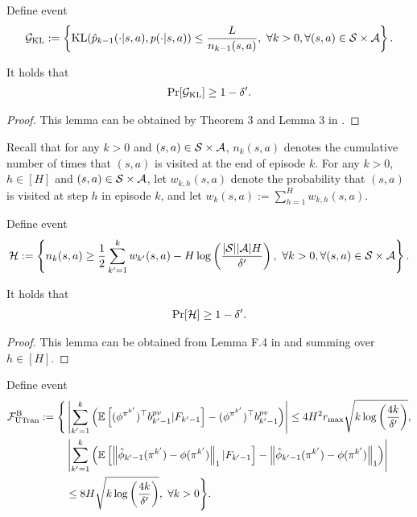 Define event
\begin{align}
	\mathcal{G}_{\textup{KL}} := \left\{  \textup{KL}(\hat{p}_{k-1}(\cdot|s,a),p(\cdot|s,a)) \leq \frac{L}{n_{k-1}(s,a)} ,\  \forall k>0, \forall (s,a) \in \mathcal{S} \times \mathcal{A}  \right\} . \label{eq:def_event_tran_kl}
\end{align}

\begin{lemma} \label{lemma:con_transition}
	It holds that
	\begin{align*}
		\Pr[\mathcal{G}_{\textup{KL}}] \geq 1-\delta' .
	\end{align*}	
\end{lemma}
\begin{proof}
	This lemma can be obtained by Theorem 3 and Lemma 3 in \cite{menard2021fast}.
\end{proof}

Recall that for any $k>0$ and $(s,a) \in \mathcal{S} \times \mathcal{A}$,  $n_k(s,a)$ denotes the cumulative number of times that $(s,a)$ is visited at the end of episode $k$. For any $k>0$, $h \in [H]$ and $(s,a) \in \mathcal{S} \times \mathcal{A}$, let $w_{k,h}(s,a)$ denote the probability that $(s,a)$ is visited at step $h$ in episode $k$, and let $w_{k}(s,a):=\sum_{h=1}^{H}w_{k,h}(s,a)$.

Define event
\begin{align}
	\mathcal{H} := \left\{  n_k(s,a) \geq \frac{1}{2} \sum_{k'=1}^{k} w_{k'}(s,a) - H \log\left( \frac{|\mathcal{S}||\mathcal{A}|H}{\delta'} \right) ,\  \forall k>0, \forall (s,a) \in \mathcal{S} \times \mathcal{A}  \right\} . \label{eq:def_event_visitation_bernoulli}
\end{align}
\begin{lemma} \label{lemma:con_visitation}
	It holds that
	\begin{align*}
		\Pr[\mathcal{H}] \geq 1-\delta' .
	\end{align*}	
\end{lemma}
\begin{proof}
	This lemma can be obtained from Lemma F.4 in \cite{dann2017unifying} and summing over $h \in [H]$.
\end{proof}


Define event 
\begin{align*}
	\mathcal{F}^{\textup{B}}_{\textup{UTran}}:=\Bigg\{ 
	&\left| \sum_{k'=1}^{k} \left(  \mathbb{E}\left[  (\phi^{\pi^{k'}})^\top b^{pv}_{k'-1} | F_{k'-1}  \right] - (\phi^{\pi^{k'}})^\top b^{pv}_{k'-1}  \right) \right| \leq 4 H^2 r_{\max} \sqrt{ k \log\left( \frac{4k}{\delta'} \right) } ,
	\nonumber\\
	&\left| \sum_{k'=1}^{k} \left( \mathbb{E}\left[  \left\|  \hat{\phi}_{k'-1}(\pi^{k'}) - \phi(\pi^{k'})  \right\|_1 | F_{k'-1}  \right] - \left\|  \hat{\phi}_{k'-1}(\pi^{k'}) - \phi(\pi^{k'})  \right\|_1  \right) \right| 
	\\
	& \leq 8H \sqrt{ k \log\left( \frac{4k}{\delta'} \right) } ,\ \forall k>0 \Bigg\} .
\end{align*}

